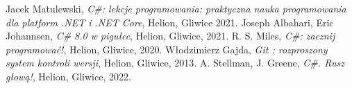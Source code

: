 \documentclass[polish,12pt,twoside,a4paper]{report}
\begin{document}




\newpage

\newpage

\newpage

\newpage

\newpage

\newpage

\begin{thebibliography}{6}

  

Jacek Matulewski, {\it C\#: lekcje programowania: praktyczna nauka programowania dla platform .NET i .NET Core}, Helion, Gliwice 2021.
Joseph  Albahari, Eric Johannsen, {\it C\# 8.0 w pigułce}, Helion, Gliwice, 2021.
R. S. Miles, {\it C\#: zacznij programować!}, Helion, Gliwice, 2020.
Włodzimierz Gajda, {\it Git : rozproszony system kontroli wersji}, Helion, Gliwice, 2013.
A. Stellman, J. Greene, {\it C\#. Rusz głową!}, Helion, Gliwice, 2022.
\end{thebibliography}
\newpage
 

\end{document}
